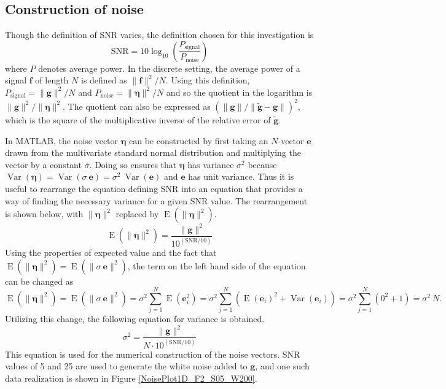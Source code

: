 \documentclass[12pt]{article}
\newcommand{\gdis}{\mathbf{g}}
\newcommand{\gnoise}{\widetilde{\mathbf{g}}}
\newcommand{\noiseSD}{\sigma}	%
\newcommand{\noise}{\bm{\eta}}	%
\newcommand{\Var}{\operatorname{Var}}	%
\newcommand{\E}{\operatorname{E}}	%
\begin{document}
\subsection{Construction of noise} \label{sec:Construction of noise}

Though the definition of SNR varies, the definition chosen for this investigation is
\begin{equation}
\label{eq:SNR}
\text{SNR} = 10\log_{10}\left(\frac{P_{\text{signal}}}{P_{\text{noise}}}\right)
\end{equation}
where $P$ denotes average power. In the discrete setting, the average power of a signal $\mathbf{f}$ of length $N$ is defined as $\|\mathbf{f}\|^2/N$. Using this definition, $P_{\text{signal}} = \|\gdis\|^2/N$ and $P_{\text{noise}} = \|\noise\|^2/N$ and so the quotient in the logarithm is $\|\gdis\|^2/\|\noise\|^2$. The quotient can also be expressed as $(\|\gdis\|/\|\gnoise - \gdis\|)^2$, which is the square of the multiplicative inverse of the relative error of $\gnoise$. \par
In MATLAB, the noise vector $\noise$ can be constructed by first taking an $N$-vector $\mathbf{e}$ drawn from the multivariate standard normal distribution and multiplying the vector by a constant $\noiseSD$. Doing so ensures that $\noise$ has variance $\noiseSD^2$ because $\Var(\noise) = \Var(\noiseSD\:\mathbf{e}) = \noiseSD^2\:\Var(\mathbf{e})$ and $\mathbf{e}$ has unit variance. Thus it is useful to rearrange the equation defining SNR into an equation that provides a way of finding the necessary variance for a given SNR value. The rearrangement is shown below, with $\|\noise\|^2$ replaced by $\E(\|\noise\|^2)$.
\[\E(\|\noise\|^2) = \frac{\|\gdis\|^2}{10^{(\text{SNR}/10)}}\]
Using the properties of expected value and the fact that $\E(\|\noise\|^2) = \E(\|\noiseSD\:\mathbf{e}\|^2)$, the term on the left hand side of the equation can be changed as
\[\E(\|\noise\|^2) = \E(\|\noiseSD\:\mathbf{e}\|^2) = \noiseSD^2 \sum_{j=1}^N \E(\mathbf{e}_i^2) = \noiseSD^2 \sum_{j=1}^N \left(\E(\mathbf{e}_i)^2 + \Var(\mathbf{e}_i)\right) = \noiseSD^2 \sum_{j=1}^N \left(0^2 + 1\right) = \noiseSD^2\:N.\]
Utilizing this change, the following equation for variance is obtained.
\begin{equation}
\label{eq:Var}
\noiseSD^2 = \frac{\|\gdis\|^2}{N \cdot 10^{(\text{SNR}/10)}}
\end{equation}
This equation is used for the numerical construction of the noise vectors. SNR values of 5 and 25 are used to generate the white noise added to $\gdis$, and one such data realization is shown in Figure \ref{NoisePlot1D_F2_S05_W200}. \par
\end{document}
